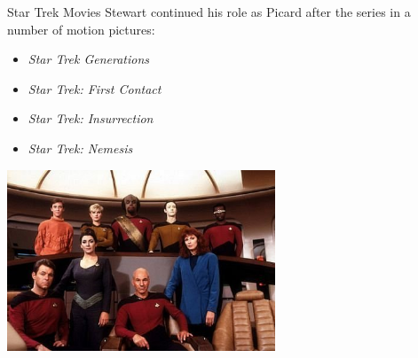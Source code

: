 \documentclass[xcolor=dvipsnames]{beamer}
\begin{document}
\begin{frame}{Star Trek Movies}
  Stewart continued his role as Picard after the series in a number of
  motion pictures:
  \begin{itemize}
    \item \emph{Star Trek Generations}
    \item \emph{Star Trek: First Contact}
    \item \emph{Star Trek: Insurrection}
    \item \emph{Star Trek: Nemesis}
  \end{itemize}
  \begin{center}
    \includegraphics[width=0.6\textwidth]{tngcast.jpg}
  \end{center}
\end{frame}
\end{document}
